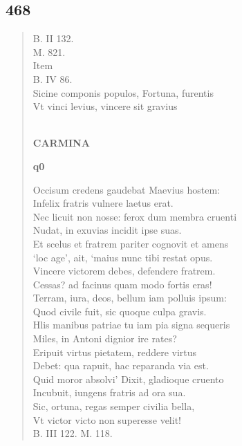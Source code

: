 \documentclass[11pt, a4paper]{report}
\begin{document}
            \subsection*{468}
      \begin{verse}
      B. II 132. \\ M. 821. \\  \lbrack Item \rbrack  \\ B. IV 86. \\ Sicine componis populos, Fortuna, furentis \\ Vt vinci levius, vincere sit gravius \\ 
        ﻿\pagebreak 
    \begin{center} \textbf{CARMINA} \end{center}\begin{center} \textbf{q0} \end{center}Occisum credens gaudebat Maevius hostem: \\ Infelix fratris vulnere laetus erat. \\ Nec licuit non nosse: ferox dum membra cruenti \\ Nudat, in exuvias incidit ipse suas. \\ Et scelus et fratrem pariter cognovit et amens \\ ‘loc age’, ait, ‘maius nunc tibi restat opus. \\ Vincere victorem debes, defendere fratrem. \\ Cessas? ad facinus quam modo fortis eras! \\ Terram, iura, deos, bellum iam polluis ipsum: \\ Quod civile fuit, sic quoque culpa gravis. \\ Hlis manibus patriae tu iam pia signa sequeris \\ Miles, in Antoni dignior ire rates? \\ Eripuit virtus pietatem, reddere virtus \\ Debet: qua rapuit, hac reparanda via est. \\ Quid moror absolvi’ Dixit, gladioque cruento \\ Incubuit, iungens fratris ad ora sua. \\ Sic, ortuna, regas semper civilia bella, \\ Vt victor victo non superesse velit! \\ B. III 122. M. 118. \\ 
      \end{verse}
  
\end{document}
